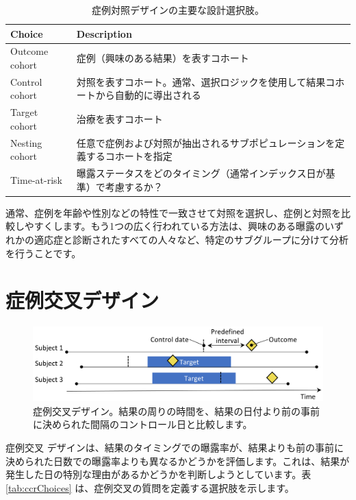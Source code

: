 \documentclass[
  11pt]{book}
\theoremstyle{definition}
\theoremstyle{definition}
\theoremstyle{definition}
\theoremstyle{definition}
\theoremstyle{remark}
\begin{document}
\begin{table}
\centering
\caption{\label{tab:ccChoices}症例対照デザインの主要な設計選択肢。}
\centering
\begin{tabular}[t]{l>{\raggedright\arraybackslash}p{9cm}}
\toprule
Choice & Description\\
\midrule
Outcome cohort & 症例（興味のある結果）を表すコホート\\
Control cohort & 対照を表すコホート。通常、選択ロジックを使用して結果コホートから自動的に導出される\\
Target cohort & 治療を表すコホート\\
Nesting cohort & 任意で症例および対照が抽出されるサブポピュレーションを定義するコホートを指定\\
Time-at-risk & 曝露ステータスをどのタイミング（通常インデックス日が基準）で考慮するか？\\
\bottomrule
\end{tabular}
\end{table}

通常、症例を年齢や性別などの特性で一致させて対照を選択し、症例と対照を比較しやすくします。もう1つの広く行われている方法は、興味のある曝露のいずれかの適応症と診断されたすべての人々など、特定のサブグループに分けて分析を行うことです。

\section{症例交叉デザイン}\label{ux75c7ux4f8bux4ea4ux53c9ux30c7ux30b6ux30a4ux30f3}


\begin{figure}[h]

{\centering \includegraphics[width=0.9\linewidth]{images/PopulationLevelEstimation/caseCrossover} 

}

\caption{症例交叉デザイン。結果の周りの時間を、結果の日付より前の事前に決められた間隔のコントロール日と比較します。}\label{fig:caseCrossover}
\end{figure}

症例交叉 \citep[ ]{maclure_1991} デザインは、結果のタイミングでの曝露率が、結果よりも前の事前に決められた日数での曝露率よりも異なるかどうかを評価します。これは、結果が発生した日の特別な理由があるかどうかを判断しようとしています。表 \ref{tab:ccrChoices} は、症例交叉の質問を定義する選択肢を示します。 
\end{document}

